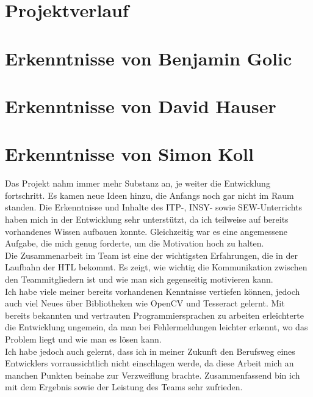 \section{Projektverlauf}

\section{Erkenntnisse von Benjamin Golic}

\section{Erkenntnisse von David Hauser}

\section{Erkenntnisse von Simon Koll}

Das Projekt nahm immer mehr Substanz an, je weiter die Entwicklung fortschritt. Es kamen neue Ideen hinzu, die Anfangs noch gar nicht im Raum standen. Die Erkenntnisse und Inhalte des ITP-, INSY- sowie SEW-Unterrichts haben mich in der Entwicklung sehr unterstützt, da ich teilweise auf bereits vorhandenes Wissen aufbauen konnte. Gleichzeitig war es eine angemessene Aufgabe, die mich genug forderte, um die Motivation hoch zu halten. \\
Die Zusammenarbeit im Team ist eine der wichtigsten Erfahrungen, die in der Laufbahn der HTL bekommt. Es zeigt, wie wichtig die Kommunikation zwischen den Teammitgliedern ist und wie man sich gegenseitig motivieren kann.\\
Ich habe viele meiner bereits vorhandenen Kenntnisse vertiefen können, jedoch auch viel Neues über Bibliotheken wie OpenCV und Tesseract gelernt. Mit bereits bekannten und vertrauten Programmiersprachen zu arbeiten erleichterte die Entwicklung ungemein, da man bei Fehlermeldungen leichter erkennt, wo das Problem liegt und wie man es lösen kann.\\
Ich habe jedoch auch gelernt, dass ich in meiner Zukunft den Berufsweg eines Entwicklers vorraussichtlich nicht einschlagen werde, da diese Arbeit mich an manchen Punkten beinahe zur Verzweiflung brachte.
Zusammenfassend bin ich mit dem Ergebnis sowie der Leistung des Teams sehr zufrieden. 